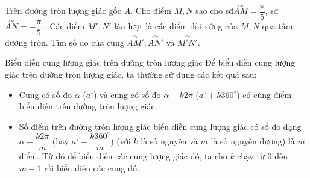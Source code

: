 \begin{bt}%
Trên đường tròn lượng giác gốc $A$. Cho điểm $M,N$ sao cho sđ$\overset{\curvearrowright}{AM}=\dfrac{\pi}{5}$, sđ$\overset{\curvearrowright}{AN}=-\dfrac{\pi}{5}$ . Các điểm $M',N'$ lần lượt là các điểm đối xứng của $M,N$ qua tâm đường tròn. Tìm số đo của cung $\overset{\curvearrowright}{AM'},\overset{\curvearrowright}{AN'}$ và $\overset{\curvearrowright}{M'N'}$.
\end{bt}








\begin{dang}{Biểu diễn cung lượng giác trên đường tròn lượng giác}
Để biểu diễn cung lượng giác trên đường tròn lượng giác, ta thường sử dụng các kết quả sau:
\begin{itemize}
\item Cung có số đo $\alpha$ ($a^{\circ}$) và cung có số đo $\alpha +k2\pi$ ($a^{\circ}+k360^{\circ}$) có cùng điểm biểu diễn trên đường tròn lượng giác.
\item Số điểm trên đường tròn lượng giác biểu diễn cung lượng giác có số đo dạng $\alpha +\dfrac{ k2\pi}{m}$ (hay $a^{\circ}+\dfrac{k360^{\circ}}{m}$) (với $k$ là số nguyên và $m$ là số nguyên dương) là $m$ điểm. Từ đó để biểu diễn các cung lượng giác đó, ta cho $k$ chạy từ $0$ đến $m-1$ rồi biểu diễn các cung đó.
\end{itemize}
\end{dang}

